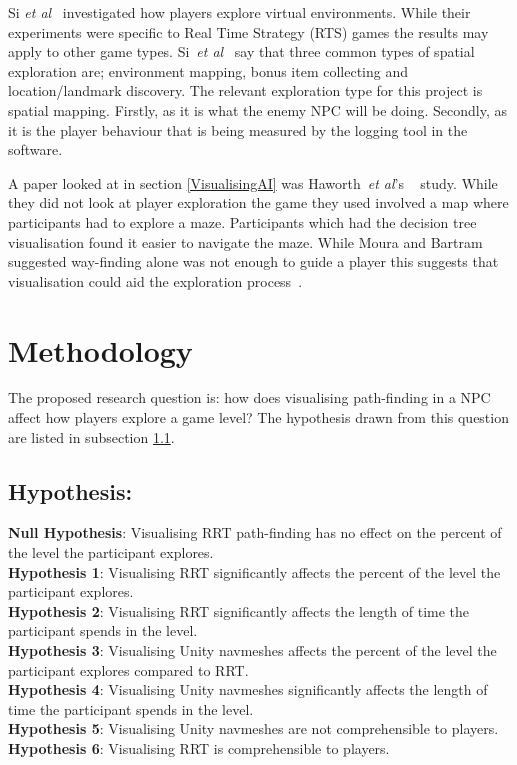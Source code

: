 \documentclass[journal]{IEEEtran}
\begin{document}
Si \textit{et al}~\cite{si2017} investigated how players explore virtual environments. While their experiments were specific to Real Time Strategy (RTS) games the results may apply to other game types. Si~\textit{et al}~\cite{si2017} say that three common types of spatial exploration are; environment mapping, bonus item collecting and location/landmark discovery. The relevant exploration type for this project is spatial mapping. Firstly, as it is what the enemy NPC will be doing.  Secondly, as it is the player behaviour that is being measured by the logging tool in the software.

A paper looked at in section \ref{VisualisingAI} was Haworth~\textit{et al}'s ~\cite{Haworth2010} study. While they did not look at player exploration the game they used involved a map where participants had to explore a maze. Participants which had the decision tree visualisation found it easier to navigate the maze. While Moura and Bartram~\cite{moura2014} suggested way-finding alone was not enough to guide a player this suggests that visualisation could aid the exploration process~\cite{Haworth2010}.

\section{Methodology} \label{methodology}
The proposed research question is: how does visualising path-finding in a NPC affect how players explore a game level? The hypothesis drawn from this question are listed in subsection \ref{hypothesis}.


\subsection{Hypothesis:} \label{hypothesis}
\textbf{Null Hypothesis}: Visualising RRT path-finding has no effect on the percent of the level the participant explores. \\
\textbf{Hypothesis 1}:  Visualising RRT significantly affects the percent of the level the participant explores. \\
\textbf{Hypothesis 2}: Visualising RRT significantly affects the length of time the participant spends in the level. \\
\textbf{Hypothesis 3}: Visualising Unity navmeshes affects the percent of the level the participant explores compared to RRT. \\
\textbf{Hypothesis 4}: Visualising Unity navmeshes significantly affects the length of time the participant spends in the level. \\
\textbf{Hypothesis 5}: Visualising Unity navmeshes are not comprehensible to players. \\
\textbf{Hypothesis 6}: Visualising RRT is comprehensible to players. \\
\end{document}
